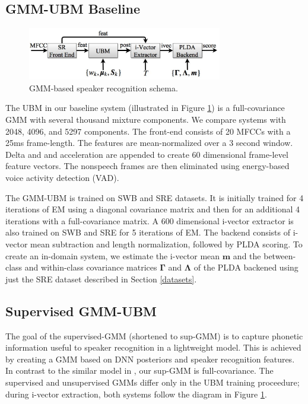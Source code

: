 \documentclass{article}
\begin{document}
\subsection{GMM-UBM Baseline}
\label{gmm_sys}

\begin{figure}[th]
\centerline{\includegraphics[width=8.5cm]{fig/baseline_schema}}
\caption{GMM-based speaker recognition schema.}
\label{fig:gmm_schema}
\end{figure}
The UBM in our baseline system (illustrated in Figure \ref{fig:gmm_schema})
is a full-covariance
GMM with several thousand mixture components. We compare
systems with 2048, 4096, and 5297 components. 
The front-end consists of 20 MFCCs with a 25ms frame-length.
The features are mean-normalized over a 3 second window. 
Delta and and acceleration are appended to create 60 dimensional
frame-level feature vectors. The nonspeech frames are then eliminated
using energy-based voice activity detection (VAD).

The GMM-UBM is trained on SWB and SRE datasets. It is initially trained
for 4 iterations of EM using a diagonal covariance matrix
 and then for an additional
4 iterations with a full-covariance matrix. A 600 dimensional i-vector
extractor is also trained on SWB and SRE for 5 iterations of EM.
The backend consists of i-vector mean subtraction and length
normalization, followed by PLDA scoring. To create an in-domain
system, we estimate the i-vector mean $\boldsymbol{m}$ and the 
between-class and within-class covariance matrices 
$\boldsymbol{\Gamma}$ and $\boldsymbol{\Lambda}$ of the PLDA backened 
using just the SRE dataset described in Section \ref{datasets}.

\subsection{Supervised GMM-UBM}
\label{sup_gmm_sys}

The goal of the supervised-GMM (shortened to sup-GMM) 
is to capture phonetic information
useful to speaker recognition in a lightweight model.
This is
achieved by creating a GMM based on DNN posteriors and speaker
recognition features. In contrast to the similar model in
 \cite{lei2014}, our sup-GMM is full-covariance. 
The supervised and unsupervised GMMs differ only
in the UBM training proceedure; during i-vector extraction,
both systems follow the diagram in Figure \ref{fig:gmm_schema}.
\end{document}
